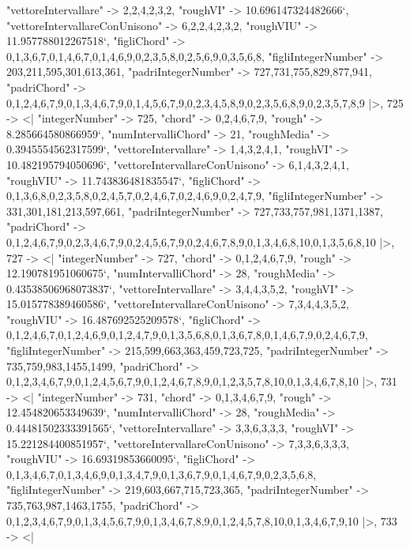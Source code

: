 \documentclass[
]{article}
\begin{document}
\begin{DatasetVerbatim}
    "vettoreIntervallare" -> {2,2,4,2,3,2},
    "roughVI" -> 10.696147324482666`,
    "vettoreIntervallareConUnisono" -> {6,2,2,4,2,3,2},
    "roughVIU" -> 11.957788012267518`,
    "figliChord" -> {{0,1,3,6,7},{0,1,4,6,7},{0,1,4,6,9},{0,2,3,5,8},{0,2,5,6,9},{0,3,5,6,8}},
    "figliIntegerNumber" -> {203,211,595,301,613,361},
    "padriIntegerNumber" -> {727,731,755,829,877,941},
    "padriChord" -> {{0,1,2,4,6,7,9},{0,1,3,4,6,7,9},{0,1,4,5,6,7,9},{0,2,3,4,5,8,9},{0,2,3,5,6,8,9},{0,2,3,5,7,8,9}}
  |>,
  725 -> <|
    "integerNumber" -> 725,
    "chord" -> {0,2,4,6,7,9},
    "rough" -> 8.285664580866959`,
    "numIntervalliChord" -> 21,
    "roughMedia" -> 0.3945554562317599`,
    "vettoreIntervallare" -> {1,4,3,2,4,1},
    "roughVI" -> 10.482195794050696`,
    "vettoreIntervallareConUnisono" -> {6,1,4,3,2,4,1},
    "roughVIU" -> 11.743836481835547`,
    "figliChord" -> {{0,1,3,6,8},{0,2,3,5,8},{0,2,4,5,7},{0,2,4,6,7},{0,2,4,6,9},{0,2,4,7,9}},
    "figliIntegerNumber" -> {331,301,181,213,597,661},
    "padriIntegerNumber" -> {727,733,757,981,1371,1387},
    "padriChord" -> {{0,1,2,4,6,7,9},{0,2,3,4,6,7,9},{0,2,4,5,6,7,9},{0,2,4,6,7,8,9},{0,1,3,4,6,8,10},{0,1,3,5,6,8,10}}
  |>,
  727 -> <|
    "integerNumber" -> 727,
    "chord" -> {0,1,2,4,6,7,9},
    "rough" -> 12.190781951060675`,
    "numIntervalliChord" -> 28,
    "roughMedia" -> 0.43538506968073837`,
    "vettoreIntervallare" -> {3,4,4,3,5,2},
    "roughVI" -> 15.015778389460586`,
    "vettoreIntervallareConUnisono" -> {7,3,4,4,3,5,2},
    "roughVIU" -> 16.487692525209578`,
    "figliChord" -> {{0,1,2,4,6,7},{0,1,2,4,6,9},{0,1,2,4,7,9},{0,1,3,5,6,8},{0,1,3,6,7,8},{0,1,4,6,7,9},{0,2,4,6,7,9}},
    "figliIntegerNumber" -> {215,599,663,363,459,723,725},
    "padriIntegerNumber" -> {735,759,983,1455,1499},
    "padriChord" -> {{0,1,2,3,4,6,7,9},{0,1,2,4,5,6,7,9},{0,1,2,4,6,7,8,9},{0,1,2,3,5,7,8,10},{0,1,3,4,6,7,8,10}}
  |>,
  731 -> <|
    "integerNumber" -> 731,
    "chord" -> {0,1,3,4,6,7,9},
    "rough" -> 12.454820653349639`,
    "numIntervalliChord" -> 28,
    "roughMedia" -> 0.44481502333391565`,
    "vettoreIntervallare" -> {3,3,6,3,3,3},
    "roughVI" -> 15.221284400851957`,
    "vettoreIntervallareConUnisono" -> {7,3,3,6,3,3,3},
    "roughVIU" -> 16.69319853660095`,
    "figliChord" -> {{0,1,3,4,6,7},{0,1,3,4,6,9},{0,1,3,4,7,9},{0,1,3,6,7,9},{0,1,4,6,7,9},{0,2,3,5,6,8}},
    "figliIntegerNumber" -> {219,603,667,715,723,365},
    "padriIntegerNumber" -> {735,763,987,1463,1755},
    "padriChord" -> {{0,1,2,3,4,6,7,9},{0,1,3,4,5,6,7,9},{0,1,3,4,6,7,8,9},{0,1,2,4,5,7,8,10},{0,1,3,4,6,7,9,10}}
  |>,
  733 -> <|

\end{DatasetVerbatim}
\end{document}
